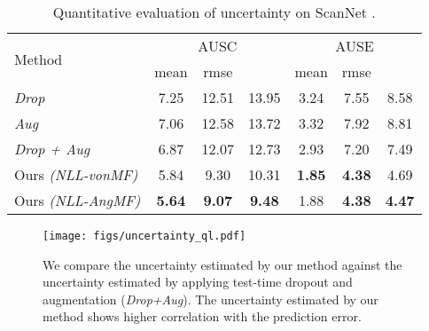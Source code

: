 \documentclass[10pt,twocolumn,letterpaper]{article}
\begin{document}
\begin{table}[t]
\setlength\tabcolsep{1.5pt}
\begin{center}
\begin{tabular}{l|ccc|ccc}
\toprule
\multirow{2}{4em}{Method} & \multicolumn{3}{c|}{\small AUSC } &
\multicolumn{3}{c}{\small AUSE }\\
\cline{2-7}
& {\small mean} & {\small rmse} & {\footnotesize }
& {\small mean} & {\small rmse} & {\footnotesize }\\
\midrule
\textit{Drop} 
& 7.25 & 12.51 & 13.95 & 3.24 & 7.55 & 8.58\\
\textit{Aug} 
& 7.06 & 12.58 & 13.72 & 3.32 & 7.92 & 8.81\\
\textit{Drop + Aug} 
& 6.87 & 12.07 & 12.73 & 2.93 & 7.20 & 7.49\\
\hline
Ours \textit{(NLL-vonMF)} 
& 5.84 & 9.30 & 10.31 & \textbf{1.85} & \textbf{4.38} & 4.69\\
Ours \textit{(NLL-AngMF)} 
& \textbf{5.64} & \textbf{9.07} & \textbf{9.48} & 1.88 & \textbf{4.38} & \textbf{4.47}\\
\bottomrule
\end{tabular}
\end{center}
\caption{Quantitative evaluation of uncertainty on ScanNet \cite{ScanNet}.}
\label{table:uncertainty-scannet}
\end{table}

\begin{figure}[t]
\begin{center}
\texttt{[image: figs/uncertainty\_ql.pdf]}
\end{center}
\caption{We compare the uncertainty estimated by our method against the uncertainty estimated by applying test-time dropout and augmentation (\textit{Drop+Aug}). The uncertainty estimated by our method shows higher correlation with the prediction error.}
\label{fig:uncertainty_comparison}
\end{figure}
\end{document}
